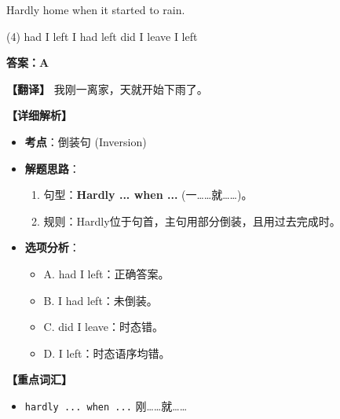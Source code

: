 \documentclass[11pt, a4paper]{article}
\newcommand{\analysis}[4]{
    \begin{solutionbox}
        \textbf{答案：#1}
        
        \textbf{【翻译】} #2
        
        \textbf{【详细解析】}
        #3
        
        \textbf{【重点词汇】}
        #4
    \end{solutionbox}
}
\newcommand{\blank}{\underline{\hspace{1.5cm}}}
\begin{document}
\begin{questions}
    \item Hardly \blank home when it started to rain.
    \begin{tasks}(4)
        \task had I left \task I had left \task did I leave \task I left
    \end{tasks}
    \analysis{A}{我刚一离家，天就开始下雨了。}{
        \begin{itemize}
            \item \textbf{考点}：倒装句 (Inversion)
            \item \textbf{解题思路}：
                \begin{enumerate}
                    \item 句型：\textbf{Hardly ... when ...} (一……就……)。
                    \item 规则：Hardly位于句首，主句用部分倒装，且用过去完成时。
                \end{enumerate}
            \item \textbf{选项分析}：
                \begin{itemize}
                    \item A. had I left：正确答案。
                    \item B. I had left：未倒装。
                    \item C. did I leave：时态错。
                    \item D. I left：时态语序均错。
                \end{itemize}
        \end{itemize}
    }{
        \begin{itemize}
            \item \texttt{hardly ... when ...} 刚……就……
        \end{itemize}
    }


\end{questions}
\end{document}
